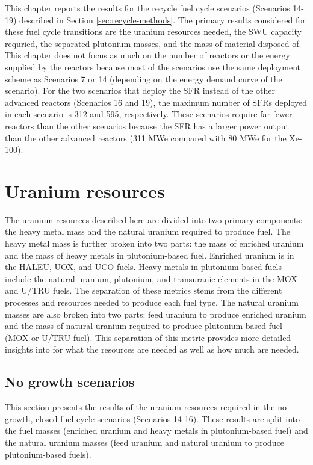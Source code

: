 This chapter reports the results for the recycle fuel cycle 
scenarios (Scenarios 14-19) described 
in Section \ref{sec:recycle-methods}. The primary results considered 
for these fuel cycle transitions are the uranium resources needed, 
the \gls{SWU} capacity requried, the separated plutonium masses, 
and the mass of material disposed of. This chapter does not focus 
as much on the number of reactors or the energy supplied by 
the reactors because most of the scenarios use the same 
deployment scheme as Scenarios 7 or 14 (depending on 
the energy demand curve of the scenario). For the two 
scenarios that deploy the \gls{SFR} instead of the other 
advanced reactors (Scenarios 16 and 19), the maximum number 
of \glspl{SFR} deployed in each scenario is 312 and 595, 
respectively. 
These scenarios require far fewer reactors than the other scenarios 
because the \gls{SFR} has a larger power output than the other 
advanced reactors (311 MWe compared with 80 MWe for the Xe-100).

\section{Uranium resources}
The uranium resources described here are divided into two primary 
components: the heavy metal mass and the natural uranium 
required to produce fuel. The heavy metal mass is further 
broken into two parts: the mass of enriched uranium and the 
mass of heavy metals in plutonium-based fuel. Enriched uranium 
is in the 
\gls{HALEU}, \gls{UOX}, and UCO fuels. Heavy metals in plutonium-based 
fuels include the natural uranium, plutonium, and transuranic 
elements in 
the \gls{MOX} and U/TRU fuels. The separation of these metrics 
stems from the different processes and resources needed to 
produce each fuel type. The natural uranium masses are also 
broken into two parts: feed uranium to produce enriched uranium 
and the mass of natural uranium required to produce 
plutonium-based fuel (\gls{MOX} or U/TRU fuel). This separation 
of this metric provides more detailed insights into for 
what the resources are needed as well as how much are needed. 

\subsection{No growth scenarios}
This section presents the results of the uranium resources required 
in the no growth, closed fuel cycle scenarios (Scenarios 14-16). 
These results are split into the fuel masses (enriched uranium 
and heavy metals in plutonium-based fuel) and the natural 
uranium masses (feed uranium and natural uranium to produce 
plutonium-based fuels).

